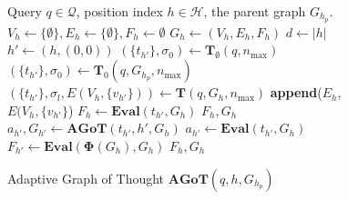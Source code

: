 \documentclass{article}
\begin{document}
\begin{figure*}[ht]
\centering 
\begin{minipage}{0.95\textwidth}
    \begin{algorithm}[H]
\caption{Adaptive Graph of Thought $\mathbf{AGoT}(q,h,G_{h_p})$}
\label{alg:agot}
\renewcommand{\algorithmicrequire}{\textbf{Input:}}
\renewcommand{\algorithmicreturn}{\textbf{Output:}}
\begin{algorithmic}[1]
\Require Query $q \in \mathcal{Q}$, position index $h \in \mathcal{H}$, the parent graph $G_{h_p}$.
\State $V_h \gets \{\emptyset\}, E_h \gets \{\emptyset\}, F_h \gets \emptyset$
\State $G_h \gets (V_h, E_h, F_h)$ 
\State $d \gets |h|$ 
\State $h' \gets (h, (0,0))$ 
\Statex
{} 
        \State $(\{t_{h'}\}, \sigma_0) \gets \mathbf{T}_{\emptyset}(q, n_\text{max})$ 
        \State $(\{t_{h'}\}, \sigma_0) \gets \mathbf{T}_0(q, G_{h_p}, n_\text{max})$ 
    \Else
        \State $(\{t_{h'}\}, \sigma_l, E(V_h, \{v_{h'}\})) \gets \mathbf{T}(q, G_{h}, n_\text{max})$
        \State \textbf{append}($E_h$, $E(V_h, \{v_{h'}\}$) 
    \EndIf
    \Statex
        \State $F_h \gets \mathbf{Eval}(t_{h'}, G_h)$ 
        \State \Return $F_h, G_h$ 
    \EndIf
    \Statex
            \State $a_{h'}, G_{h'} \gets \mathbf{AGoT}(t_{h'}, h', G_h)$ 
        \Else
            \State $a_{h'} \gets \mathbf{Eval}(t_{h'}, G_h)$ 
        \EndIf
    \EndFor
\EndFor
\Statex
\State $F_{h'} \gets \mathbf{Eval}(\mathbf{\Phi}(G_h), G_h)$ 
\State \Return $F_h, G_h$ 
\end{algorithmic}
\end{algorithm}

\end{minipage}   
\end{figure*}
\end{document}
